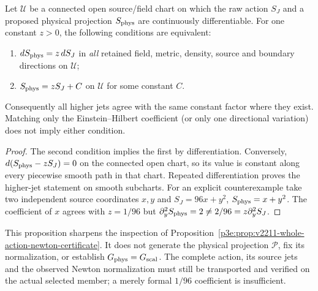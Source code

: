 \documentclass[12pt,a4paper]{article}
\begin{document}
\begin{proposition}
\label{p3e:prop:v356-whole-action-jet-criterion}
Let $\mathcal U$ be a connected open source/field chart on which
the raw action $S_J$ and a proposed physical projection $S_{\rm phys}$
are continuously differentiable.  For one constant $z>0$, the
following conditions are equivalent:
\begin{enumerate}
\item $dS_{\rm phys}=z\,dS_J$ in \emph{all} retained field,
metric, density, source and boundary directions on $\mathcal U$;
\item $S_{\rm phys}=z S_J+C$ on $\mathcal U$ for some constant $C$.
\end{enumerate}
Consequently all higher jets agree with the same constant factor
where they exist.  Matching only the Einstein--Hilbert coefficient
(or only one directional variation) does not imply either condition.
\end{proposition}
\begin{proof}
The second condition implies the first by differentiation.  Conversely,
$d(S_{\rm phys}-zS_J)=0$ on the connected open chart, so its value is
constant along every piecewise smooth path in that chart.  Repeated
differentiation proves the higher-jet statement on smooth subcharts.
For an explicit counterexample take two independent source coordinates
$x,y$ and $S_J=96x+y^2$, $S_{\rm phys}=x+y^2$.
The coefficient of $x$ agrees with $z=1/96$ but
$\partial_y^2S_{\rm phys}=2\ne 2/96=z\partial_y^2S_J$.
\end{proof}

\begin{remark}
\label{p3e:rem:v356-newton-owner-limits}
This proposition sharpens the inspection of
Proposition~\ref{p3e:prop:v2211-whole-action-newton-certificate}.
It does not generate the physical projection $\mathcal P$, fix its
normalization, or establish $G_{\rm phys}=G_{\rm scal}$.
The complete action, its source jets and the observed Newton
normalization must still be transported and verified on the actual
selected member; a merely formal $1/96$ coefficient is insufficient.
\end{remark}
\end{document}
